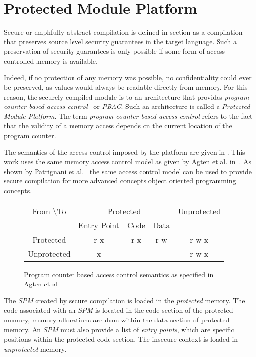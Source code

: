 \section{Protected Module Platform}
\label{sec:protectedmoduleplatform}
Secure or emph{fully abstract} compilation is defined in section  as a compilation that preserves source level security guarantees in the target language.
Such a preservation of security guarantees is only possible if some form of access controlled memory is available.

Indeed, if no protection of any memory was possible, no confidentiality could ever be preserved, as values would always be readable directly from memory.
For this reason, the securely compiled module is to an architecture that provides \emph{program counter based access control}~\cite{PCBAC} or \emph{PBAC}.
Such an architecture is called a \emph{Protected Module Platform}. 
The term \emph{program counter based access control} refers to the fact that the validity of a memory access depends on the current location of the program counter.

The semantics of the access control imposed by the platform are given in .
This work uses the same memory access control model as given by Agten et al. in~\cite{Agten:2012:SCM:2354412.2355247}.
As shown by Patrignani et al.~\cite{Patrignani} the same access control model can be used to provide secure compilation for more advanced concepts object oriented programming concepts.

\begin{figure}[htb]
    \centering
	\begin{tabular}{|c|c|c|c|c|}
		\hline
		From \textbackslash To & \multicolumn{3}{c|}{Protected} & Unprotected \\
		& Entry Point & Code & Data & \\ \hline
		Protected & r x & r x & r w & r w x \\ \hline
		Unprotected & x & & & r w x \\ \hline
	\end{tabular}
    \caption[PCBAC Semantics]{Program counter based access control semantics as specified in Agten et al.\cite{Agten:2012:SCM:2354412.2355247}. \label{fig:AccessControlSemantics}}
\end{figure}

The \emph{SPM} created by secure compilation is loaded in the \emph{protected} memory.
The code associated with an \emph{SPM} is located in the code section of the protected memory, memory allocations are done within the data section of protected memory.
An \emph{SPM} must also provide a list of \emph{entry points}, which are specific positions within the protected code section.
The insecure context is loaded in \emph{unprotected} memory.

